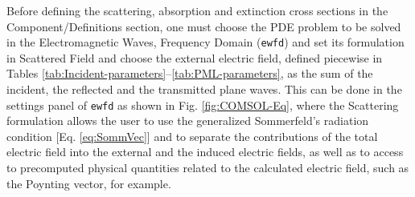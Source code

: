 Before defining the scattering, absorption and extinction cross sections in the Component/Definitions section, one must choose the PDE problem to be solved in the Electromagnetic Waves, Frequency Domain (\lstinline!ewfd!) and set its formulation in Scattered Field and choose the external electric field, defined piecewise in Tables \ref{tab:Incident-parameters}--\ref{tab:PML-parameters}, as the sum of the incident, the reflected and the transmitted plane waves. This can be done in the settings panel of \lstinline!ewfd! as shown in Fig. \ref{fig:COMSOL-Eq}, where the Scattering formulation allows the user to use the generalized Sommerfeld's  radiation condition [Eq. \eqref{eq:SommVec}] and to separate the contributions of the total electric field into the external and the induced electric fields, as well as to access to precomputed physical quantities related to the calculated electric field, such as the Poynting vector, for example.

